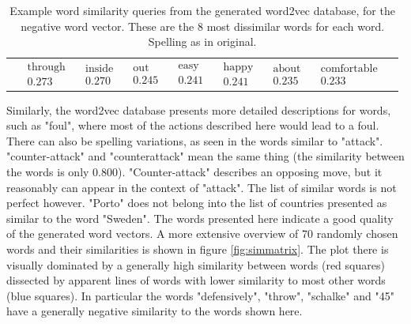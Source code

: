 \documentclass[10pt, a4paper]{UUThesisTemplate}
\begin{document}
\begin{table}
\begin{tabular}{r|c c c c c c c c}
& $ \begin{matrix} \text{through} \\ 0.273 \end{matrix}$
& $ \begin{matrix} \text{inside} \\ 0.270 \end{matrix}$
& $ \begin{matrix} \text{out} \\ 0.245 \end{matrix}$
& $ \begin{matrix} \text{easy} \\ 0.241 \end{matrix}$
& $ \begin{matrix} \text{happy} \\ 0.241 \end{matrix}$
& $ \begin{matrix} \text{about} \\ 0.235 \end{matrix}$
& $ \begin{matrix} \text{comfortable} \\ 0.233 \end{matrix}$
\end{tabular}
\caption{Example word similarity queries from the generated word2vec database, for the negative word vector. These are the 8 most dissimilar words for each word. Spelling as in original.}\label{tab:dissim}
\end{table}


Similarly, the word2vec database presents more detailed descriptions for words, such as "foul", where most of the actions described here would lead to a foul. There can also be spelling variations, as seen in the words similar to "attack". "counter-attack" and "counterattack" mean the same thing (the similarity between the words is only $0.800$). "Counter-attack" describes an opposing move, but it reasonably can appear in the context of "attack". The list of similar words is not perfect however. "Porto" does not belong into the list of countries presented as similar to the word "Sweden". The words presented here indicate a good quality of the generated word vectors. A more extensive overview of 70 randomly chosen words and their similarities is shown in figure \ref{fig:simmatrix}. The plot there is visually dominated by a generally high similarity between words (red squares) dissected by apparent lines of words with lower similarity to most other words (blue squares). In particular the words "defensively", "throw", "schalke" and "45" have a generally negative similarity to the words shown here.
\end{document}
